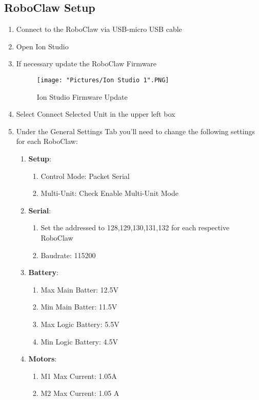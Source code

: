 \documentclass[12pt]{article}
\begin{document}
\subsection{RoboClaw Setup}
\begin{enumerate}
	\item Connect to the RoboClaw via USB-micro USB cable
	\item Open Ion Studio
	\item If necessary update the RoboClaw Firmware
	\begin{figure}[H]
 		\centering
		\texttt{[image: "Pictures/Ion Studio 1".PNG]}
 		\caption{Ion Studio Firmware Update}
	\end{figure}
	
	\item Select Connect Selected Unit in the upper left box
	\item Under the General Settings Tab you'll need to change the following settings for each RoboClaw:
	\begin{enumerate}
		\item \textbf{Setup}:
		\begin{enumerate}
			\item Control Mode: Packet Serial
			\item Multi-Unit: Check Enable Multi-Unit Mode
		\end{enumerate}

		\item \textbf{Serial}:
		\begin{enumerate}
			\item Set the addressed to 128,129,130,131,132 for each respective RoboClaw
			\item Baudrate: 115200
		\end{enumerate}

		\item \textbf{Battery}:
		\begin{enumerate}
			\item Max Main Batter: 12.5V
			\item Min Main Batter: 11.5V
			\item Max Logic Battery: 5.5V
			\item Min Logic Battery: 4.5V
		\end{enumerate}

		\item \textbf{Motors}:
		\begin{enumerate}
			\item M1 Max Current: 1.05A
			\item M2 Max Current: 1.05 A
		\end{enumerate}


\end{enumerate}
\end{enumerate}
\end{document}
